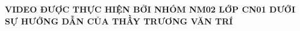 \documentclass[preview]{standalone}
\begin{document}
\begin{center}
\textbf{VIDEO ĐƯỢC THỰC HIỆN BỞI NHÓM NM02 LỚP CN01 DƯỚI SỰ HƯỚNG DẪN CỦA THẦY TRƯƠNG VĂN TRÍ}
\end{center}
\end{document}
